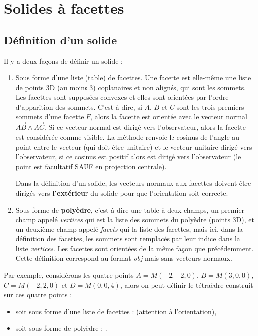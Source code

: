 \section{Solides à facettes}

\subsection{Définition d'un solide}

Il y a deux façons de définir un solide :
\begin{enumerate}
    \item Sous forme d'une liste (table) de facettes. Une facette est elle-même une liste de points 3D (au moins 3) coplanaires et non alignés, qui sont les sommets. Les facettes sont supposées convexes et elles sont orientées par l'ordre d'apparition des sommets. C'est à dire, si $A$, $B$ et $C$ sont les trois premiers sommets d'une facette $F$, alors la facette est orientée avec le vecteur normal $\vec{AB}\wedge\vec{AC}$. Si ce vecteur normal est dirigé vers l'observateur, alors la facette est considérée comme visible. La méthode  renvoie le cosinus de l'angle au point  entre le vecteur  (qui doit être unitaire) et le vecteur unitaire dirigé vers l'observateur, si ce cosinus est positif alors  est dirigé vers l'observateur (le point  est facultatif SAUF en projection centrale).
    
    Dans la définition d'un solide, les vecteurs normaux aux facettes doivent être dirigés vers \textbf{l'extérieur} du solide pour que l'orientation soit correcte.
    
    \item Sous forme de \textbf{polyèdre}, c'est à dire une table à deux champs, un premier champ appelé \emph{vertices} qui est la liste des sommets du polyèdre (points 3D), et un deuxième champ appelé \emph{facets} qui la liste des facettes, mais ici, dans la définition des facettes, les sommets sont remplacés par leur indice dans la liste \emph{vertices}. Les facettes sont orientées de la même façon que précédemment. Cette définition correspond au format \emph{obj} mais sans vecteurs normaux.
\end{enumerate}

Par exemple, considérons les quatre points $A=M(-2,-2,0)$, $B=M(3,0,0)$, $C=M(-2,2,0)$ et $D=M(0,0,4)$, alors on peut définir le tétraèdre construit sur ces quatre points :
\begin{itemize}
    \item soit sous forme d'une liste de facettes :  (attention à l'orientation),
    \item soit sous forme de polyèdre : 
    .
\end{itemize}

